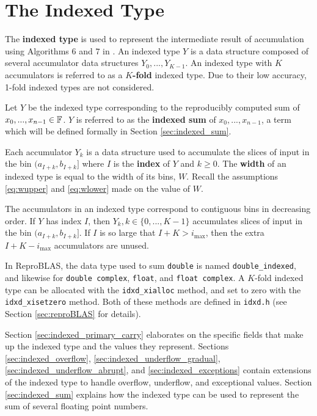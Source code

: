\section{The Indexed Type}
  \label{sec:indexed}
    The \textbf{indexed type} is used to represent the intermediate result of
    accumulation using Algorithms 6 and $7$ in \cite{repsum}.  An indexed type
    $Y$ is a data structure composed of several accumulator data structures
    $Y_0, ..., Y_{K - 1}$. An indexed type with $K$ accumulators is referred to
    as a \textbf{$K$-fold} indexed type. Due to their low accuracy, 1-fold
    indexed types are not considered.

    Let $Y$ be the indexed type corresponding to the reproducibly computed sum
    of $x_0, ..., x_{n - 1} \in \mathbb{F}$. $Y$ is referred to as the \textbf{indexed
    sum} of $x_0, ..., x_{n - 1}$, a term which will be defined formally in
    Section \ref{sec:indexed_sum}.

    Each accumulator $Y_k$ is a data structure used to accumulate the slices of
    input in the bin $(a_{I + k}, b_{I + k}]$ where $I$ is the \textbf{index}
    of $Y$ and $k \geq 0$. The \textbf{width} of an indexed
    type is equal to the width of its bins, $W$. Recall the assumptions
    \eqref{eq:wupper} and \eqref{eq:wlower} made on the value of $W$.

    The accumulators in an indexed type correspond to contiguous bins in
    decreasing order.     If $Y$ has index $I$, then $Y_k, k \in \{0, ..., K - 1\}$ accumulates slices
    of input in the bin $(a_{I + k}, b_{I + k}]$. If $I$ is so large that
    $I + K > i_{\max}$, then the extra $I + K - i_{\max}$ accumulators are unused.

    In ReproBLAS, the data type used to sum \texttt{double} is named \texttt{double\_indexed}, and likewise for \texttt{double complex}, \texttt{float}, and \texttt{float complex}. A $K$-fold indexed type can be allocated with the \texttt{idxd\_xialloc} method, and set to zero with the \texttt{idxd\_xisetzero} method. Both of these methods are defined in \texttt{idxd.h} (see Section \ref{sec:reproBLAS} for details).

    Section \ref{sec:indexed_primary_carry} elaborates on the specific fields
    that make up the indexed type and the values they represent. Sections
    \ref{sec:indexed_overflow}, \ref{sec:indexed_underflow_gradual},
    \ref{sec:indexed_underflow_abrupt}, and \ref{sec:indexed_exceptions}
    contain extensions of the indexed type to handle overflow, underflow, and
    exceptional values. Section \ref{sec:indexed_sum} explains how the indexed type can be used to represent the sum of several floating point numbers.

